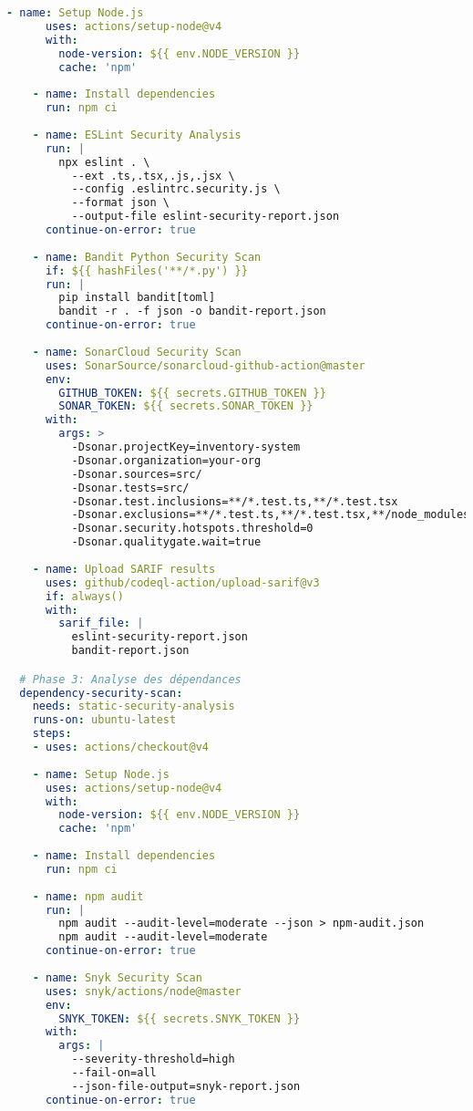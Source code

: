 \documentclass[12pt,a4paper]{report}
\begin{document}
\begin{lstlisting}[language=YAML, caption=Pipeline GitHub Actions DevSecOps complète]
    - name: Setup Node.js
      uses: actions/setup-node@v4
      with:
        node-version: ${{ env.NODE_VERSION }}
        cache: 'npm'
    
    - name: Install dependencies
      run: npm ci
    
    - name: ESLint Security Analysis
      run: |
        npx eslint . \
          --ext .ts,.tsx,.js,.jsx \
          --config .eslintrc.security.js \
          --format json \
          --output-file eslint-security-report.json
      continue-on-error: true
    
    - name: Bandit Python Security Scan
      if: ${{ hashFiles('**/*.py') }}
      run: |
        pip install bandit[toml]
        bandit -r . -f json -o bandit-report.json
      continue-on-error: true
    
    - name: SonarCloud Security Scan
      uses: SonarSource/sonarcloud-github-action@master
      env:
        GITHUB_TOKEN: ${{ secrets.GITHUB_TOKEN }}
        SONAR_TOKEN: ${{ secrets.SONAR_TOKEN }}
      with:
        args: >
          -Dsonar.projectKey=inventory-system
          -Dsonar.organization=your-org
          -Dsonar.sources=src/
          -Dsonar.tests=src/
          -Dsonar.test.inclusions=**/*.test.ts,**/*.test.tsx
          -Dsonar.exclusions=**/*.test.ts,**/*.test.tsx,**/node_modules/**
          -Dsonar.security.hotspots.threshold=0
          -Dsonar.qualitygate.wait=true
    
    - name: Upload SARIF results
      uses: github/codeql-action/upload-sarif@v3
      if: always()
      with:
        sarif_file: |
          eslint-security-report.json
          bandit-report.json

  # Phase 3: Analyse des dépendances
  dependency-security-scan:
    needs: static-security-analysis
    runs-on: ubuntu-latest
    steps:
    - uses: actions/checkout@v4
    
    - name: Setup Node.js
      uses: actions/setup-node@v4
      with:
        node-version: ${{ env.NODE_VERSION }}
        cache: 'npm'
    
    - name: Install dependencies
      run: npm ci
    
    - name: npm audit
      run: |
        npm audit --audit-level=moderate --json > npm-audit.json
        npm audit --audit-level=moderate
      continue-on-error: true
    
    - name: Snyk Security Scan
      uses: snyk/actions/node@master
      env:
        SNYK_TOKEN: ${{ secrets.SNYK_TOKEN }}
      with:
        args: |
          --severity-threshold=high
          --fail-on=all
          --json-file-output=snyk-report.json
      continue-on-error: true
    

\end{lstlisting}
\end{document}

